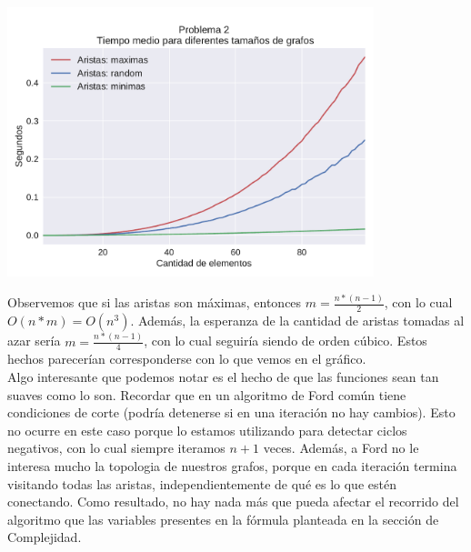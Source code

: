 {\centering
  \includegraphics[width=0.8\textwidth]{imagenes/problema2/n_aristas.pdf} \\
}

Observemos que si las aristas son máximas, entonces $m = \frac{n*(n-1)}{2}$, con lo cual $O(n*m) = O(n^3)$. Además, la esperanza de la cantidad de aristas tomadas al azar sería $m = \frac{n*(n-1)}{4}$, con lo cual seguiría siendo de orden cúbico. Estos hechos parecerían corresponderse con lo que vemos en el gráfico. \\

Algo interesante que podemos notar es el hecho de que las funciones sean tan suaves como lo son. Recordar que en un algoritmo de Ford común tiene condiciones de corte (podría detenerse si en una iteración no hay cambios). Esto no ocurre en este caso porque lo estamos utilizando para detectar ciclos negativos, con lo cual siempre iteramos $n+1$ veces. Además, a Ford no le interesa mucho la topologia de nuestros grafos, porque en cada iteración termina visitando todas las aristas, independientemente de qué es lo que estén conectando. Como resultado, no hay nada más que pueda afectar el recorrido del algoritmo que las variables presentes en la fórmula planteada en la sección de Complejidad.
